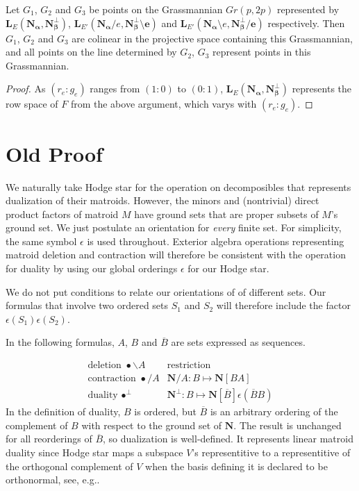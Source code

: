 \documentclass[Unicode]{cedram-alco}
\newcommand{\ext}[1]{\ensuremath{\mathbf{#1}}}
\begin{document}
\begin{prop}
Let $G_1$, $G_2$ and $G_3$ be points on the Grassmannian $Gr(p,2p)$ represented by
$\ext{L}_E(\ext{N_\alpha},\ext{N_\beta^\perp})$,
$\ext{L}_{E'}(\ext{N_\alpha}/e,\ext{N_\beta^\perp\setminus e})$ and
$\ext{L}_{E'}(\ext{N_\alpha}\setminus e,\ext{N_\beta^\perp/e})$ respectively. Then
$G_1$, $G_2$ and $G_3$ are colinear in the projective space containing this Grassmannian, and
all points on the line determined by $G_2$, $G_3$ represent points in this Grassmannian.
\end{prop}
\begin{proof}
  As $(r_e:g_e)$ ranges from $(1:0)$ to $(0:1)$, $\ext{L}_E(\ext{N_\alpha},\ext{N_\beta^\perp})$ represents
  the row space of $F$ from the above argument, which varys with $(r_e:g_e)$.
\end{proof}

\newpage

\section{Old Proof}

We naturally take Hodge star for the operation on
decomposibles that represents dualization of their
matroids.
However, the minors and
(nontrivial) direct product factors of matroid $M$
have ground sets that are proper subsets of $M$'s ground set.
We just postulate an orientation for \emph{every} finite set.
For simplicity, the same symbol $\epsilon$ is used throughout.
Exterior algebra operations
representing matroid deletion and contraction will therefore
be consistent with the operation for duality by using our
global orderings $\epsilon$ for our Hodge star.

We do not put conditions to relate our orientations of
of different sets.  Our formulas that involve two ordered sets $S_1$
and $S_2$ will therefore include the factor $\epsilon(S_1)\epsilon(S_2)$.




In the following formulas, $A$, $B$ and $\overline{B}$ are
sets expressed as sequences.

    \[
    \begin{array}{cc}
\text{deletion\ } \bullet\backslash A  & \text{restriction}  \\
\text{contraction\ }\bullet / A             & \ext{N}/A:B\mapsto\ext{N}[BA]\\
\text{duality\ }\bullet^{\perp} &
\ext{N}^{\perp}:B\mapsto\ext{N}[\overline{B}]\epsilon(\overline{B}B)
    \end{array}
    \]
    In the definition of duality, $B$ is ordered,
    but $\overline{B}$ is an arbitrary ordering of the complement of $B$
    with respect to the ground set of $\ext{N}$.
    The result is unchanged for all reorderings of $\overline{B}$,
    so dualization is well-defined.  It represents linear matroid duality
    since Hodge star maps a subspace $V$'s representitive to a representitive
    of the orthogonal complement of $V$ when the basis defining it is
    declared to be orthonormal, see, e.g.\cite{MarcusFDMuAlPt2}.
\end{document}

